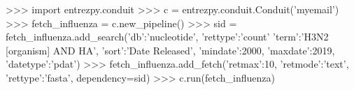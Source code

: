 \begin{python}[basicstyle=\smaller\ttfamily]
  >>> import entrezpy.conduit
  >>> c = entrezpy.conduit.Conduit('myemail')
  >>> fetch_influenza = c.new_pipeline()
  >>> sid = fetch_influenza.add_search({'db':'nucleotide', 'rettype':'count' 'term':'H3N2 [organism] AND HA', 'sort':'Date Released', 'mindate':2000, 'maxdate':2019, 'datetype':'pdat'})
  >>> fetch_influenza.add_fetch({'retmax':10, 'retmode':'text', 'rettype':'fasta'}, dependency=sid)
  >>> c.run(fetch_influenza)
\end{python}
